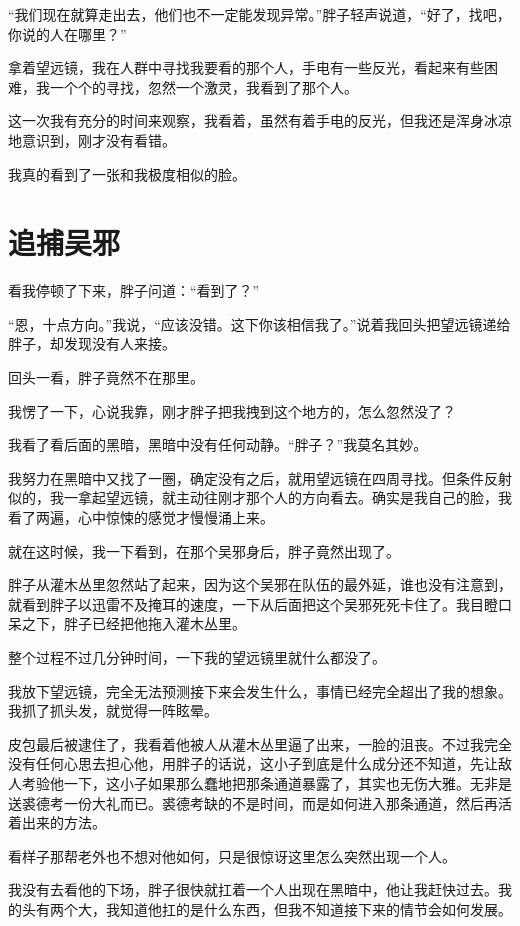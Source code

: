 “我们现在就算走出去，他们也不一定能发现异常。”胖子轻声说道，“好了，找吧，你说的人在哪里？”

拿着望远镜，我在人群中寻找我要看的那个人，手电有一些反光，看起来有些困难，我一个个的寻找，忽然一个激灵，我看到了那个人。

这一次我有充分的时间来观察，我看着，虽然有着手电的反光，但我还是浑身冰凉地意识到，刚才没有看错。

我真的看到了一张和我极度相似的脸。

\chapter{追捕吴邪}

看我停顿了下来，胖子问道：“看到了？”

“恩，十点方向。”我说，“应该没错。这下你该相信我了。”说着我回头把望远镜递给胖子，却发现没有人来接。

回头一看，胖子竟然不在那里。

我愣了一下，心说我靠，刚才胖子把我拽到这个地方的，怎么忽然没了？

我看了看后面的黑暗，黑暗中没有任何动静。“胖子？”我莫名其妙。

我努力在黑暗中又找了一圈，确定没有之后，就用望远镜在四周寻找。但条件反射似的，我一拿起望远镜，就主动往刚才那个人的方向看去。确实是我自己的脸，我看了两遍，心中惊悚的感觉才慢慢涌上来。

就在这时候，我一下看到，在那个吴邪身后，胖子竟然出现了。

胖子从灌木丛里忽然站了起来，因为这个吴邪在队伍的最外延，谁也没有注意到，就看到胖子以迅雷不及掩耳的速度，一下从后面把这个吴邪死死卡住了。我目瞪口呆之下，胖子已经把他拖入灌木丛里。

整个过程不过几分钟时间，一下我的望远镜里就什么都没了。

我放下望远镜，完全无法预测接下来会发生什么，事情已经完全超出了我的想象。我抓了抓头发，就觉得一阵眩晕。

皮包最后被逮住了，我看着他被人从灌木丛里逼了出来，一脸的沮丧。不过我完全没有任何心思去担心他，用胖子的话说，这小子到底是什么成分还不知道，先让敌人考验他一下，这小子如果那么蠢地把那条通道暴露了，其实也无伤大雅。无非是送裘德考一份大礼而已。裘德考缺的不是时间，而是如何进入那条通道，然后再活着出来的方法。

看样子那帮老外也不想对他如何，只是很惊讶这里怎么突然出现一个人。

我没有去看他的下场，胖子很快就扛着一个人出现在黑暗中，他让我赶快过去。我的头有两个大，我知道他扛的是什么东西，但我不知道接下来的情节会如何发展。

